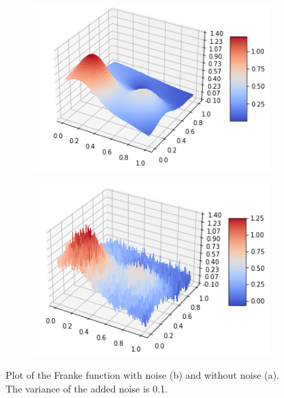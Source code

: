 \begin{figure}
\centering
\begin{subfigure}{.5\textwidth}
  \centering
  \includegraphics[width=.9\linewidth]{Images/franke_function.png}
  \caption{}
  \label{fig:franke}
\end{subfigure}%
\begin{subfigure}{.5\textwidth}
  \centering
  \includegraphics[width=.9\linewidth]{Images/franke_function_noise.png}
  \caption{}
  \label{fig:franke_noise}
\end{subfigure}
\caption{Plot of the Franke function with noise (b) and without noise (a). The variance of the added noise is 0.1.}
\label{fig:franke_function}
\end{figure}
